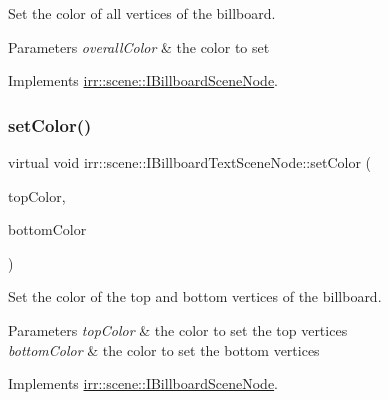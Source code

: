 Set the color of all vertices of the billboard. 


\begin{DoxyParams}{Parameters}
{\em overall\+Color} & the color to set \\
\hline
\end{DoxyParams}


Implements \hyperlink{classirr_1_1scene_1_1IBillboardSceneNode_a82c1038a6dfcd255863baa96aaba4182}{irr\+::scene\+::\+I\+Billboard\+Scene\+Node}.

\mbox{\label{classirr_1_1scene_1_1IBillboardTextSceneNode_ab3faa7c4238acd6bc3a2330cb5650da5}} 
\subsubsection{\texorpdfstring{set\+Color()}{setColor()}\hspace{0.1cm}{\footnotesize\ttfamily [3/4]}}
{\footnotesize\ttfamily virtual void irr\+::scene\+::\+I\+Billboard\+Text\+Scene\+Node\+::set\+Color (\begin{DoxyParamCaption}\item[{const \hyperlink{classirr_1_1video_1_1SColor}{video\+::\+S\+Color} \&}]{top\+Color,  }\item[{const \hyperlink{classirr_1_1video_1_1SColor}{video\+::\+S\+Color} \&}]{bottom\+Color }\end{DoxyParamCaption})\hspace{0.3cm}{\ttfamily [pure virtual]}}



Set the color of the top and bottom vertices of the billboard. 


\begin{DoxyParams}{Parameters}
{\em top\+Color} & the color to set the top vertices \\
\hline
{\em bottom\+Color} & the color to set the bottom vertices \\
\hline
\end{DoxyParams}


Implements \hyperlink{classirr_1_1scene_1_1IBillboardSceneNode_a13efdfa73998706baf10cedcdb48d559}{irr\+::scene\+::\+I\+Billboard\+Scene\+Node}.

